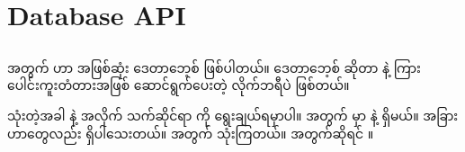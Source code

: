 \section{Database API}

\subsection*{}
 အတွက်  ဟာ  အဖြစ်ဆုံး   ဒေတာဘေ့စ်  ဖြစ်ပါတယ်။ ဒေတာဘေ့စ်  ဆိုတာ  နဲ့  ကြား ပေါင်းကူးတံတားအဖြစ် ဆောင်ရွက်ပေးတဲ့ လိုက်ဘရီပဲ ဖြစ်တယ်။

 သုံးတဲ့အခါ  နဲ့  အလိုက် သက်ဆိုင်ရာ  ကို ရွေးချယ်ရမှာပါ။  အတွက်  မှာ  နဲ့  ရှိမယ်။ အခြားဟာတွေလည်း ရှိပါသေးတယ်။  အတွက်  သုံးကြတယ်။  အတွက်ဆိုရင် ။  

